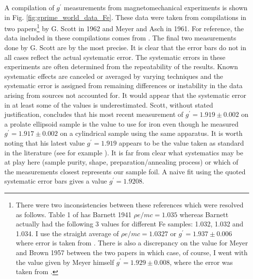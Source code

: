 \documentclass[12pt]{article}
\begin{document}
A compilation of $g^{\prime}$ measurements from magnetomechanical experiments is shown in Fig. \ref{fig:gprime_world_data_Fe}. These data were taken from compilations in two papers\footnote{There were two inconsistencies between these references\cite{Scott1962,Meyer1961} which were resolved as follows. Table 1 of \cite{Meyer1961} has Barnett 1941 $\rho e/mc=1.035$ whereas Barnett\cite{Barnett1952} actually had the following 3 values for different Fe samples: 1.032, 1.032 and 1.034. I use the straight average of  $\rho e/mc=1.0327$ or $g^{\prime}= 1.937\pm0.006$ where error is taken from \cite{Scott1962}. There is also a discrepancy on the value for Meyer and Brown 1957 between the two papers in which case, of course, I went with the value given by Meyer himself \cite{Meyer1961} $g^{\prime}=1.929\pm0.008$, where the error was taken from \cite{Scott1962}.} 
 by G. Scott in 1962\cite{Scott1962} and Meyer and Asch in 1961\cite{Meyer1961}. For reference, the data included in these compilations comes from \cite{Barnett1944,Scott1951,Barnett1952,Scott1962}. The final two measurements done by G. Scott are by the most precise. It is clear that the error bars do not in all cases reflect the actual systematic error. The systematic errors in these experiments are often determined from the repeatability of the results. Known systematic effects are canceled or averaged by varying techniques and the systematic error is assigned from remaining differences or instability in the data arising from sources not accounted for. It would appear that the systematic error in at least some of the values is underestimated. Scott, without stated justification, concludes that his most recent measurement of $g^{\prime}=1.919\pm0.002$ on a prolate ellipsoid sample is the value to use for iron \cite{Scott1960, Scott1962} even though he measured  $g^{\prime}=1.917\pm0.002$ on a cylindrical sample using the same apparatus. It is worth noting that his latest value  $g^{\prime}=1.919$ appears to be the value taken as standard in the literature (see for example \cite{Wohlfarth1980,Bonnenberg1986}). It is far from clear what systematics may be at play here (sample purity, shape, preparation/annealing process) or which of the measurements closest represents our sample foil. A naive fit using the quoted systematic error bars gives a value $g^{\prime}=1.9208$.
\end{document}

